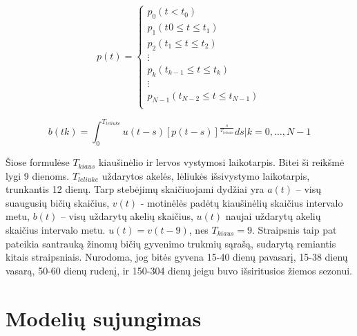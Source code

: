 \documentclass{VUMIFKompMagistrinis}
\begin{document}
\begin{equation}
\label{emir4}
p(t)=
\begin{cases}
p_{0} (t<t_0 )                                           \\
p_{1} (t_{}0≤t≤t_{1} )                          \\
p_{2} (t_{1}≤t≤t_{2} )                                \\
\vdots \\
p_{k} (t_{k-1}≤t≤t_{k} )                               \\
\vdots \\
p_{N-1} (t_{N-2}≤t≤t_{N-1} )   \\
\end{cases}
\end{equation}

\begin{equation}
\label{emir5}
b(tk)=\int_{0}^{T_{leliuke}}u(t-s) [p(t-s)]^{\frac{s}{T_{leliuke}}} ds | k=0,…,N-1
\end{equation}

Šiose formulėse $T_{kiaus}$ kiaušinėlio ir lervos vystymosi laikotarpis. Bitei ši reikšmė lygi 9 dienoms. $T_{leliuke}$ uždarytos akelės, lėliukės išsivystymo laikotarpis, trunkantis 12 dienų. Tarp stebėjimų skaičiuojami dydžiai yra $a(t)$ – visų suaugusių bičių skaičius, $v(t)$ - motinėlės padėtų kiaušinėlių skaičius intervalo metu, $b(t)$ – visų uždarytų akelių skaičius, $u(t)$ naujai uždarytų akelių skaičius intervalo metu. $u(t)=v(t-9)$, nes $T_{kiaus}=9$. 
Straipsnis taip pat pateikia santrauką žinomų bičių gyvenimo trukmių sąrašą, sudarytą remiantis kitais straipsniais. Nurodoma, jog bitės gyvena 15-40 dienų pavasarį, 15-38 dienų vasarą, 50-60 dienų rudenį, ir 150-304 dienų jeigu buvo išsiritusios žiemos sezonui.




\section{Modelių sujungimas}
\end{document}
